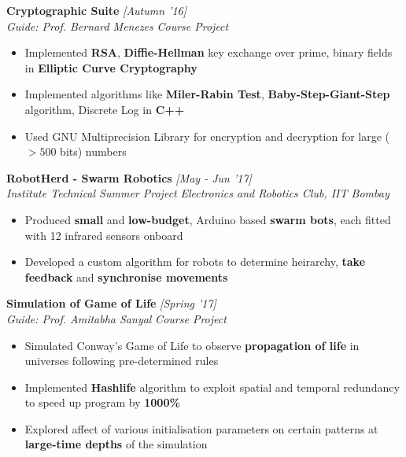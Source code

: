 \documentclass{article}
\begin{document}
\hspace{-14pt}\textbf{\large{Cryptographic Suite}} \hfill{\sl [Autumn '16]}\\
{\it Guide: Prof. Bernard Menezes} \hfill{\sl Course Project}\\
\vspace{-19pt}
\begin{itemize}[itemsep = -2pt, leftmargin=*]
	\item Implemented \textbf{RSA}, \textbf{Diffie-Hellman} key exchange over prime, binary fields in \textbf{Elliptic Curve Cryptography}
	\item Implemented algorithms like \textbf{Miler-Rabin Test}, \textbf{Baby-Step-Giant-Step} algorithm, Discrete Log in \textbf{C++}
	\item Used GNU Multiprecision Library for encryption and decryption for large ($>500$ bits) numbers
\end{itemize}
\newpage
\hspace{-14pt}\textbf{\large{RobotHerd - Swarm Robotics}} \hfill{\sl [May - Jun '17]}\\
{\it Institute Technical Summer Project} \hfill{\sl Electronics and Robotics Club, IIT Bombay}\\
\vspace{-19pt}
\begin{itemize}[itemsep = -2pt, leftmargin=*]
	\item Produced \textbf{small} and \textbf{low-budget}, Arduino based \textbf{swarm bots}, each fitted with 12 infrared sensors onboard
	\item Developed a custom algorithm for robots to determine heirarchy, \textbf{take feedback} and \textbf{synchronise movements}
\end{itemize}
\vspace{-2pt}

\hspace{-14pt}\textbf{\large{Simulation of Game of Life}} \hfill{\sl [Spring '17]}\\
{\it Guide: Prof. Amitabha Sanyal} \hfill{\sl Course Project}\\
\vspace{-19pt}
\begin{itemize}[itemsep = -2pt, leftmargin=*]
	\item Simulated Conway's Game of Life to observe \textbf{propagation of life} in universes following pre-determined rules
	\item Implemented \textbf{Hashlife} algorithm to exploit spatial and temporal redundancy to speed up program by \textbf{1000\%}
	\item Explored affect of various initialisation parameters on certain patterns at \textbf{large-time depths} of the simulation
\end{itemize}
\vspace{-14pt}
\end{document}
